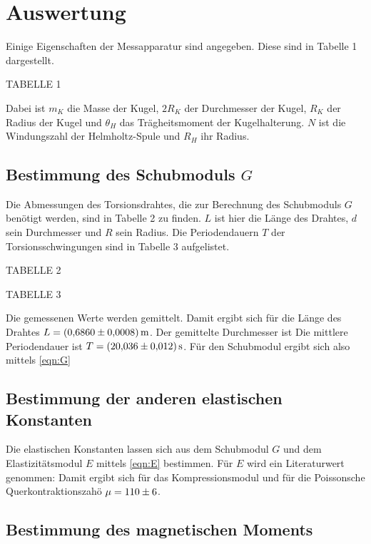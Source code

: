 \section{Auswertung}
Einige Eigenschaften der Messapparatur sind angegeben.
Diese sind in Tabelle 1 dargestellt.

TABELLE 1

Dabei ist $m_{K}$ die Masse der Kugel, $2R_{K}$ der Durchmesser
der Kugel, $R_{K}$ der Radius der Kugel und $\theta_{H}$ das
Trägheitsmoment der Kugelhalterung.
$N$ ist die Windungszahl der Helmholtz-Spule und $R_{H}$ ihr Radius.
\subsection{Bestimmung des Schubmoduls $G$}
Die Abmessungen des Torsionsdrahtes, die zur Berechnung des Schubmoduls $G$ benötigt werden,
sind in Tabelle 2 zu finden. $L$ ist hier die Länge des Drahtes,
$d$ sein Durchmesser und $R$ sein Radius. Die Periodendauern $T$ der
Torsionsschwingungen sind in Tabelle 3 aufgelistet.

TABELLE 2

TABELLE 3

Die gemessenen Werte werden gemittelt.
Damit ergibt sich für die Länge des Drahtes $L = \SI{0.6860 \pm 0.0008}{\metre}$.
Der gemittelte Durchmesser ist %
Die mittlere Periodendauer ist $T = \SI{20.036 \pm 0.012}{\second}$.
Für den Schubmodul ergibt sich also mittels \eqref{eqn:G}
\subsection{Bestimmung der anderen elastischen Konstanten}
Die elastischen Konstanten lassen sich aus dem Schubmodul $G$
und dem Elastizitätsmodul $E$ mittels \eqref{eqn:E} bestimmen.
Für $E$ wird ein Literaturwert genommen:
Damit ergibt sich für das Kompressionsmodul %
und für die Poissonsche Querkontraktionszahö $\mu = \num{110 \pm 6}$.
\subsection{Bestimmung des magnetischen Moments}

